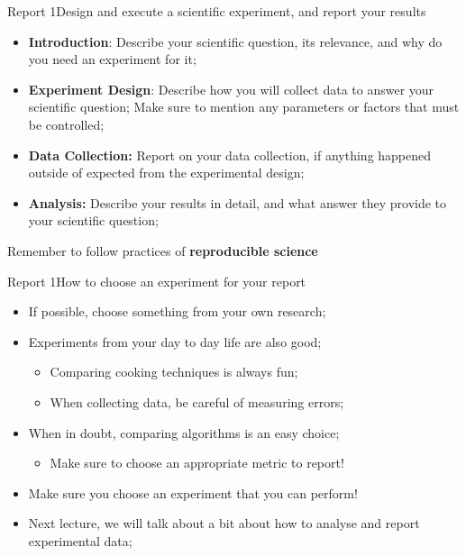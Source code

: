 \documentclass{beamer}
\begin{document}
\begin{CJK}{UTF8}{ipxm}
\begin{frame}{Report 1}{Design and execute a scientific experiment, and report your results}
  \begin{itemize}
    \item {\bf Introduction}: Describe your scientific question, its relevance, and why do you need an experiment for it;
    \item {\bf Experiment Design}: Describe how you will collect data to answer your scientific question; Make sure to mention any parameters or factors that must be controlled;
    \item {\bf Data Collection:} Report on your data collection, if anything happened outside of expected from the experimental design;
    \item {\bf Analysis:} Describe your results in detail, and what answer they provide to your scientific question;
  \end{itemize}
  \begin{alertblock}{}
    \alert{Remember to follow practices of {\bf reproducible science}}
  \end{alertblock}
\end{frame}

\begin{frame}{Report 1}{How to choose an experiment for your report}
  \begin{itemize}
    \item If possible, choose something from your own research;
    \medskip

    \item Experiments from your day to day life are also good;
    \begin{itemize}
      \item Comparing cooking techniques is always fun;
      \item When collecting data, be careful of measuring errors;
    \end{itemize}
    \medskip

    \item When in doubt, comparing algorithms is an easy choice;
    \begin{itemize}
      \item Make sure to choose an appropriate metric to report!
    \end{itemize}
    \medskip

    \item Make sure you choose an experiment that you can perform!
    \bigskip

    \item Next lecture, we will talk about a bit about how to analyse and report experimental data;
  \end{itemize}
\end{frame}


\end{CJK}
\end{document}
